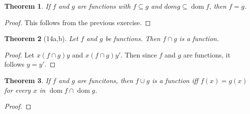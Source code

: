 \documentclass[12pt]{article}
\theoremstyle{plain}
\newtheorem*{exthm}{Theorem}
\theoremstyle{remark}
\theoremstyle{definition}
\theoremstyle{remark}
\DeclareMathOperator{\dom}{dom}
\begin{document}
\begin{exthm}
If $f$ and $g$ are functions with $f \subseteq g$ and $dom g \subseteq \dom{f}$, then $f = g$.
\end{exthm}
\begin{proof}
This follows from the previous exercise.
\end{proof}

\begin{exthm}[14a,b]
Let $f$ and $g$ be functions. Then $f \cap g$ is a function.
\end{exthm}
\begin{proof}
Let $x(f\cap g)y$ and $x(f \cap g)y'$. Then since $f$ and $g$ are functions, it follows $y = y'$.
\end{proof}
\begin{exthm}
If $f$ and $g$ are funcitons, then $f \cup g$ is a function iff $f(x) = g(x)$ for every $x$ in $\dom{f} \cap \dom{g}$.
\end{exthm}
\begin{proof}

\end{proof}
\end{document}
